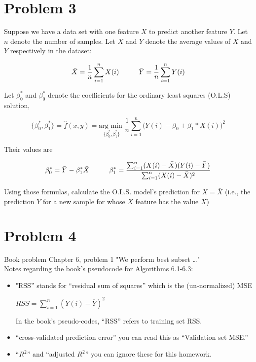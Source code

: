 \documentclass[12pt]{article}
\newcommand\tab[1][1cm]{\hspace*{#1}}
\begin{document}
\pagebreak
\section{Problem 3}
Suppose we have a data set with one feature $X$ to predict another feature $Y$. Let $n$ denote the number of samples. Let $X$ and $Y$ denote the average values of $X$ and $Y$ respectively in the dataset:

\begin{center}
    \[
        \bar{X} = \frac{1}{n}\sum_{i = 1}^{n}X(i)
        \tab
        \bar{Y} = \frac{1}{n}\sum_{i = 1}^{n}Y(i)
    \]
\end{center}

Let $\beta_{0}^{*}$ and $\beta_{0}^{*}$ denote the coefficients for the ordinary least squares (O.L.S) solution,

\begin{center}
    \[
        \{\beta_{0}^{*}, \beta_{1}^{*}\} = \hat{f}(x,y) = \underset{\{\beta_{0}^{*}, \beta_{1}^{*}\}}{\text{arg min }}\frac{1}{n}\sum_{i = 1}^{n} \bigg( Y(i) - \beta_0 + \beta_1*X(i) \bigg) ^2
    \]
\end{center}

Their values are

\begin{center}
    \[
        \beta_{0}^{*} = \bar{Y} - \beta_{1}^{*}\bar{X}
        \tab
        \beta_{1}^{*} = \frac{\sum_{i = 1}^{n}(X(i) - \bar{X})(Y(i)-\bar{Y})}{\sum_{i = 1}^{n}(X(i)-\bar{X})^2}
    \]
\end{center}

Using those formulas, calculate the O.L.S. model's prediction for $ X = \bar{X}$ (i.e., the prediction $\bar{Y}$ for a new sample for whose $X$ feature has the value $\bar{X}$)

\pagebreak
\section{Problem 4}
Book problem Chapter 6, problem 1 "We perform best subset \dots"\\

Notes regarding the book's pseudocode for Algorithms 6.1-6.3:

\begin{itemize}
    \item "RSS” stands for “residual sum of squares” which is the (un-normalized) MSE
          \begin{center}
              $RSS = \sum_{i = 1}^{n} ( Y(i) - \overline{Y} )^{2}$
          \end{center}
          In the book's pseudo-codes, “RSS” refers to training set RSS.

    \item “cross-validated prediction error” \- you can read this as “Validation set MSE.”
    \item “$R^2$” and “adjusted $R^2$” \- you can ignore these for this homework.
\end{itemize}

\end{document}
